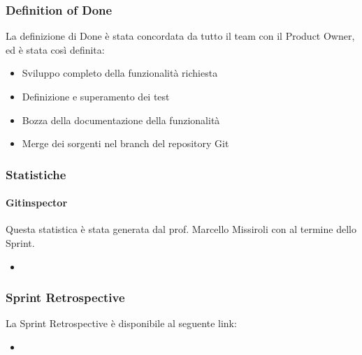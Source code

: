 \documentclass[letterpaper,10pt,italian]{sphinxmanual}
\begin{document}
\subsubsection{Definition of Done}
\label{\detokenize{development/sprint0/index:definition-of-done}}
\sphinxAtStartPar
La definizione di Done è stata concordata da tutto il team con il Product Owner, ed è stata così
definita:
\begin{itemize}
\item {} 
\sphinxAtStartPar
Sviluppo completo della funzionalità richiesta

\item {} 
\sphinxAtStartPar
Definizione e superamento dei test

\item {} 
\sphinxAtStartPar
Bozza della documentazione della funzionalità

\item {} 
\sphinxAtStartPar
Merge dei sorgenti nel branch  del repository Git

\end{itemize}


\subsubsection{Statistiche}
\label{\detokenize{development/sprint0/index:statistiche}}

\paragraph{Gitinspector}
\label{\detokenize{development/sprint0/index:gitinspector}}
\sphinxAtStartPar
Questa statistica è stata generata dal prof. Marcello Missiroli con
 al termine dello Sprint.
\begin{itemize}
\item {} 
\sphinxAtStartPar
{}

\end{itemize}


\subsubsection{Sprint Retrospective}
\label{\detokenize{development/sprint0/index:sprint-retrospective}}
\sphinxAtStartPar
La Sprint Retrospective è disponibile al seguente link:
\begin{itemize}
\item {} 
\sphinxAtStartPar
{}

\end{itemize}
\end{document}
